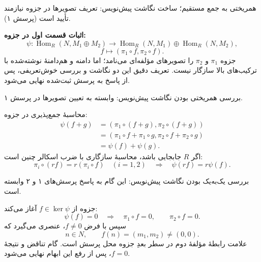 \begin{frame}[t]{همریختی به جمع مستقیم؛ ساخت نگاشت}
    \label{lec07:hom-into-sum-map}
    \alert{پیش‌نویس: تعریف تصویرها در جزوه نیازمند تأیید است (پرسش ۱).}
    \medskip

    \textbf{اثبات قسمت اول در جزوه:}
    \[
        \psi:\operatorname{Hom}_R(N,M_1\oplus M_2)
        \longrightarrow\operatorname{Hom}_R(N,M_1)\oplus\operatorname{Hom}_R(N,M_2),
    \]
    \[
        f\longmapsto(\pi_1\circ f,\pi_2\circ f).
    \]
    جزوه \(\pi_1\) و \(\pi_2\) را تصویرهای مؤلفه‌ای می‌نامد؛ اما دامنه و هم‌دامنهٔ نوشته‌شده با ترکیب‌های بالا سازگار نیست.
    تعریف دقیق این دو نگاشت و بررسی خوش‌تعریفی، پس از پاسخ به پرسش ثبت‌شده نهایی می‌شود.
\end{frame}

\begin{frame}[t]{بررسی همریختی بودن نگاشت}
    \label{lec07:hom-into-sum-linearity}
    \alert{پیش‌نویس: وابسته به تعیین تصویرها در پرسش ۱.}
    \medskip

    محاسبهٔ جمع‌پذیری در جزوه:
    \[
        \begin{aligned}
            \psi(f+g)&=(\pi_1\circ(f+g),\pi_2\circ(f+g))\\
                &=(\pi_1\circ f+\pi_1\circ g,\pi_2\circ f+\pi_2\circ g)\\
                &=\psi(f)+\psi(g).
        \end{aligned}
    \]
    اگر \(R\) جابجایی باشد، محاسبهٔ سازگاری با ضرب اسکالر چنین است:
    \[
        \pi_i\circ(rf)=r(\pi_i\circ f)\quad(i=1,2)
        \quad\Longrightarrow\quad\psi(rf)=r\psi(f).
    \]
\end{frame}

\begin{frame}[t]{بررسی یک‌به‌یک بودن نگاشت}
    \label{lec07:hom-into-sum-injectivity}
    \alert{پیش‌نویس: این گام به پاسخ پرسش‌های ۱ و ۲ وابسته است.}
    \medskip

    جزوه از \(f\in\ker\psi\) آغاز می‌کند:
    \[
        \psi(f)=0\quad\Longrightarrow\quad
        \pi_1\circ f=0,\qquad\pi_2\circ f=0.
    \]
    سپس با فرض \(f\ne0\)، عنصری می‌گیرد که
    \[
        n\in N,\qquad f(n)=(m_1,m_2)\ne(0,0).
    \]
    علامت رابطهٔ مؤلفهٔ دوم در سطر بعدِ جزوه محل پرسش است.
    گام تناقض و نتیجهٔ \(f=0\)، پس از رفع این ابهام نهایی می‌شود.
\end{frame}

